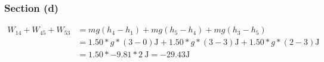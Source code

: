 \documentclass[12pt]{article}
\begin{document}
\subsubsection*{Section (d)}
\begin{align*}
    W_{14} + W_{45} + W_{53} &= mg(h_4 - h_1) + mg(h_5 - h_4) + mg(h_3 - h_5)\\
        &= 1.50 * g * (3 - 0) \unit{\joule} + 1.50 * g * (3 - 3) \unit{\joule} + 1.50 * g * (2 - 3) \unit{\joule}\\
        &= 1.50 * -9.81 * 2\ \unit{\joule} = \boxed{ -29.43\unit{\joule} }
\end{align*}


\pagebreak








\end{document}
